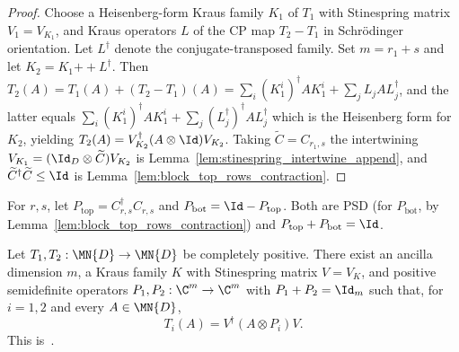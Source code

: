 \begin{proof}\leanok
    Choose a Heisenberg-form Kraus family $K_1$ of $T_1$ with Stinespring
    matrix $V_1 = V_{K_1}$, and Kraus operators $L$ of the CP map
    $T_2 - T_1$ in Schr\"odinger orientation. Let $L^\dagger$ denote the
    conjugate-transposed family. Set $m = r_1 + s$ and let
    $K_2 = K_1 \mathbin{+\!+} L^\dagger$. Then
    $T_2(A) = T_1(A) + (T_2 - T_1)(A)
        = \sum_i (K_1^i)^\dagger A K_1^i + \sum_j L_j A L_j^\dagger$,
    and the latter equals
    $\sum_i (K_1^i)^\dagger A K_1^i + \sum_j (L_j^\dagger)^\dagger A L_j^\dagger$
    which is the Heisenberg form for $K_2$, yielding
    $T_2(A) = V_{K_2}^\dagger (A \otimes \Id) V_{K_2}$. Taking
    $\widetilde C = C_{r_1, s}$ the intertwining
    $V_{K_1} = (\Id_D \otimes \widetilde C) V_{K_2}$ is
    Lemma~\ref{lem:stinespring_intertwine_append}, and
    $\widetilde C^\dagger \widetilde C \le \Id$ is
    Lemma~\ref{lem:block_top_rows_contraction}.
\end{proof}

\begin{definition}
    \label{def:block_diag_projectors}
    \leanok
    For $r, s$, let $P_{\mathrm{top}} = C_{r,s}^\dagger C_{r,s}$ and
    $P_{\mathrm{bot}} = \Id - P_{\mathrm{top}}$. Both are PSD
    (for $P_{\mathrm{bot}}$, by Lemma~\ref{lem:block_top_rows_contraction})
    and $P_{\mathrm{top}} + P_{\mathrm{bot}} = \Id$.
\end{definition}

\begin{theorem}
    \label{thm:cp_exists_radon_nikodym}
    \leanok
    Let $T_1, T_2 : \MN{D} \to \MN{D}$ be completely positive. There exist
    an ancilla dimension $m$, a Kraus family $K$ with Stinespring matrix
    $V = V_K$, and positive semidefinite operators
    $P_1, P_2 : \C^m \to \C^m$ with $P_1 + P_2 = \Id_m$ such that, for
    $i = 1, 2$ and every $A \in \MN{D}$,
    \[
        T_i(A) = V^\dagger (A \otimes P_i) V.
    \]
    This is~\cite[Theorem~2.4]{Wolf2012Quantum}.
\end{theorem}

